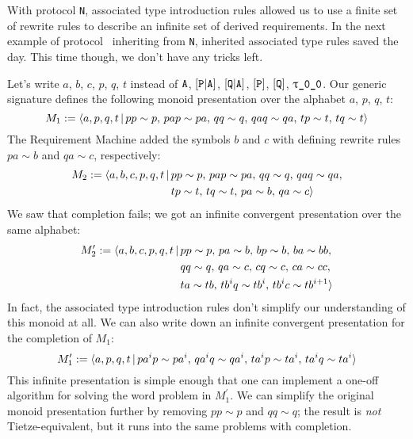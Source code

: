 \documentclass[../generics]{subfiles}
\begin{document}
\begin{example}
With protocol \texttt{N}, associated type introduction rules allowed us to use a finite set of rewrite rules to describe an infinite set of derived requirements. In the next example of protocol \tQ\ inheriting from \texttt{N}, inherited associated type rules saved the day. This time though, we don't have any tricks left.

\smallskip

Let's write $a$, $b$, $c$, $p$, $q$, $t$ instead of $\texttt{A}$, $[\texttt{P}|\texttt{A}]$, $[\texttt{Q}|\texttt{A}]$, $[\texttt{P}]$, $[\texttt{Q}]$, $\rT$. Our generic signature defines the following monoid presentation over the alphabet $a$, $p$, $q$, $t$:
\[M_1 := \langle a,p,q,t\,|\,pp\sim p,\,pap\sim pa,\,qq\sim q,\, qaq\sim qa,\, tp\sim t,\, tq\sim t\rangle\]
The Requirement Machine added the symbols $b$ and $c$ with defining rewrite rules $pa\sim b$ and $qa\sim c$, respectively:
\begin{align*}
M_2 := \langle a,b,c,p,q,t\,|\,\hbox{}&pp\sim p,\,pap\sim pa,\,qq\sim q,\, qaq\sim qa,\\
&tp\sim t,\, tq\sim t,\,pa\sim b,\,qa\sim c\rangle
\end{align*}
We saw that completion fails; we got an infinite convergent presentation over the same alphabet:
\begin{align*}
M_2^\prime := \langle a,b,c,p,q,t\,|\,\hbox{}&pp\sim p,\,pa\sim b,\,bp\sim b,\,ba\sim bb,\\
&qq\sim q,\,qa\sim c,\,cq\sim c,\,ca\sim cc,\\
&ta\sim tb,\, tb^iq\sim tb^i,\,tb^ic\sim tb^{i+1}\rangle
\end{align*}
In fact, the associated type introduction rules don't simplify our understanding of this monoid at all. We can also write down an infinite convergent presentation for the completion of $M_1$:
\[M_1^\prime := \langle a,p,q,t\,|\,pa^ip\sim pa^i,\, qa^iq\sim qa^i,\, ta^ip\sim ta^i,\, ta^iq\sim ta^i\rangle\]
This infinite presentation is simple enough that one can implement a one-off algorithm for solving the word problem in $M_1^\prime$. We can simplify the original monoid presentation further by removing $pp\sim p$ and $qq\sim q$; the result is \emph{not} Tietze-equivalent, but it runs into the same problems with completion.


\end{example}
\end{document}
